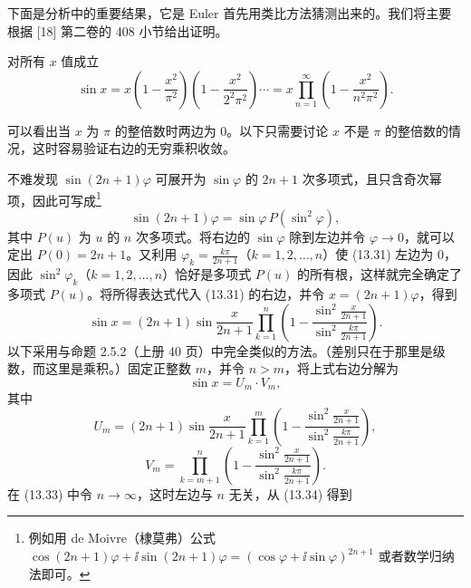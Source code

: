下面是分析中的重要结果，它是 Euler 首先用类比方法猜测出来的。我们将主要根据 [18] 第二卷的 408 小节给出证明。

\begin{xexample}[13.4.3（Euler）]
对所有 $x$ 值成立
\begin{equation}
\sin x=x\left(1-\frac{x^2}{\pi^2}\right)\left(1-\frac{x^2}{2^2\pi^2}\right)\cdots
=x\prod_{n=1}^{\infty}\left(1-\frac{x^2}{n^2\pi^2}\right).
\tag{13.30}
\end{equation}
\end{xexample}
\begin{xproof}
可以看出当 $x$ 为 $\pi$ 的整倍数时两边为 0。以下只需要讨论 $x$ 不是 $\pi$ 的整倍数的情况，这时容易验证右边的无穷乘积收敛。

不难发现 $\sin(2n+1)\varphi$ 可展开为 $\sin\varphi$ 的 $2n+1$ 次多项式，且只含奇次幂项，因此可写成\footnote{例如用 de Moivre（棣莫弗）公式 $\cos(2n+1)\varphi+\ii\sin(2n+1)\varphi=(\cos\varphi+\ii\sin\varphi)^{2n+1}$ 或者数学归纳法即可。}
\begin{equation}
\sin(2n+1)\varphi=\sin\varphi\,P(\sin^2\varphi),
\tag{13.31}
\end{equation}
其中 $P(u)$ 为 $u$ 的 $n$ 次多项式。将右边的 $\sin\varphi$ 除到左边并令 $\varphi\to0$，就可以定出 $P(0)=2n+1$。又利用 $\varphi_k=\frac{k\pi}{2n+1}$（$k=1,2,\ldots,n$）使 (13.31) 左边为 0，因此 $\sin^2\varphi_k$（$k=1,2,\ldots,n$）恰好是多项式 $P(u)$ 的所有根，这样就完全确定了多项式 $P(u)$。将所得表达式代入 (13.31) 的右边，并令 $x=(2n+1)\varphi$，得到
\begin{equation}
\sin x=(2n+1)\sin\frac{x}{2n+1}\prod_{k=1}^{n}\left(1-\frac{\sin^2\frac{x}{2n+1}}{\sin^2\frac{k\pi}{2n+1}}\right).
\tag{13.32}
\end{equation}
以下采用与命题 2.5.2（上册 40 页）中完全类似的方法。（差别只在于那里是级数，而这里是乘积。）固定正整数 $m$，并令 $n>m$，将上式右边分解为
\begin{equation}
\sin x=U_m\cdot V_m,
\tag{13.33}
\end{equation}
其中
\begin{equation}
U_m=(2n+1)\sin\frac{x}{2n+1}\prod_{k=1}^{m}\left(1-\frac{\sin^2\frac{x}{2n+1}}{\sin^2\frac{k\pi}{2n+1}}\right),
\tag{13.34}
\end{equation}
\begin{equation}
V_m=\prod_{k=m+1}^{n}\left(1-\frac{\sin^2\frac{x}{2n+1}}{\sin^2\frac{k\pi}{2n+1}}\right).
\tag{13.35}
\end{equation}
在 (13.33) 中令 $n\to\infty$，这时左边与 $n$ 无关，从 (13.34) 得到
\begin{equation}

\end{equation}
\end{xproof}
